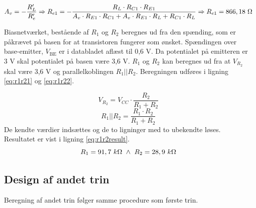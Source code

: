 \begin{equation}
A_v = -\frac{R'_L}{R'_e} \Rightarrow  R_{e1} =-\frac{R_L \cdot R_{C1} \cdot R_{E1}}{A_v \cdot R_{E1} \cdot R_{C1} + A_v \cdot R_{E1} \cdot R_L + R_{C1} \cdot R_L} \Rightarrow R_{e1} = 866,18~\ohm
\end{equation}

Biasnetværket, bestående af $R_1$ og $R_2$ beregnes ud fra den spænding, som er påkrævet på basen for at transistoren fungerer som ønsket. Spændingen over base-emitter, $V_{\mathrm{BE}}$ er i databladet aflæst til 0,6 V. Da potentialet på emitteren er 3 V skal potentialet på basen være 3,6 V. $R_1$ og $R_2$ kan beregnes ud fra at $V_{R_2}$ skal være 3,6 V og parallelkoblingen $R_1||R_2$. Beregningen udføres i ligning \ref{eq:r1r21} og \ref{eq:r1r22}.

\begin{equation}
V_{R_2} = V_{CC} \cdot \frac{R_2}{R_1+R_2} 
\label{eq:r1r21}
\end{equation}
\begin{equation}
R_1||R_2 = \frac{R_1 \cdot R_2}{R_1 + R_2}
\label{eq:r1r22}
\end{equation}
De kendte værdier indsættes og de to ligninger med to ubekendte løses. Resultatet er vist i ligning \ref{eq:r1r2result}.
\begin{equation}
R_1 = 91,7~k\ohm ~ \wedge ~ R_2=28,9~k\ohm
\label{eq:r1r2result}
\end{equation}



\subsection*{Design af andet trin}
Beregning af andet trin følger samme procedure som første trin. 


